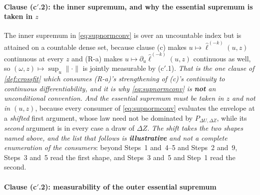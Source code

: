 \paragraph{Clause \textup{(c$'$.2)}: the inner supremum, and why the essential supremum is taken in $z$}

The inner supremum in \eqref{eq:supnormconv} is over an uncountable index but is attained on a
countable dense set, because clause \textup{(c)} makes $u\mapsto\hat\ell^{(-k)}(u,z)$ continuous at
every $z$ and (R-a) makes $u\mapsto\partial_u\hat\ell^{(-k)}(u,z)$ continuous as well, so
$(\omega,z)\mapsto\sup_u\|\cdot\|$ is jointly measurable by \textup{(c$'$.1)}. \emph{That is the one
clause of \cref{def:crossfit} which consumes (R-a)'s strengthening of \textup{(c)}'s continuity to
continuous differentiability, and it is why \eqref{eq:supnormconv} is \textbf{not} an unconditional
convention.}
\emph{And the essential supremum must be taken in $z$ and not in $(u,z)$}, because every consumer of
\eqref{eq:supnormconv} evaluates the envelope at a \emph{shifted} first argument, whose law need not be
dominated by $P_{\Delta U,\Delta Z}$, while its \emph{second} argument is in every case a draw of
$\Delta Z$. \emph{The shift takes the two shapes named above, and the list that follows is
\textbf{illustrative} and not a complete enumeration of the consumers}: beyond
 Steps~1 and~4--5 and  Steps~2 and~9,
 Steps~3 and~5 read the first shape, and  Steps~3
and~5 and  Step~1 read the second.

\paragraph{Clause \textup{(c$'$.2)}: measurability of the outer essential supremum}


